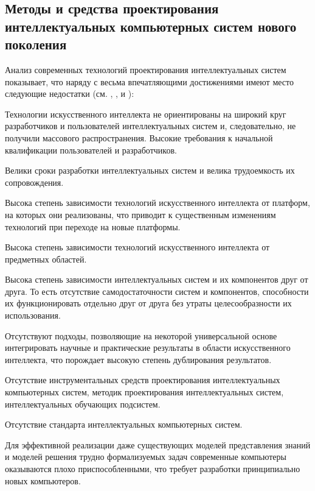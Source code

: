 
\begin{partbacktext}
\part{Методы и средства проектирования интеллектуальных компьютерных систем нового поколения}
\noindent
Анализ современных технологий проектирования интеллектуальных систем показывает, что
наряду с весьма впечатляющими достижениями имеют место следующие недостатки (см. , ,  и ):
\begin{textitemize}
	\item{Технологии искусственного интеллекта не ориентированы на широкий круг разработчиков и пользователей интеллектуальных систем и, следовательно, не получили массового распространения. Высокие требования к начальной квалификации пользователей и разработчиков.}
	\item{Велики сроки разработки интеллектуальных систем и велика трудоемкость их
		сопровождения.}
	\item{Высока степень зависимости технологий искусственного интеллекта от платформ, на которых
		они реализованы, что приводит к существенным изменениям технологий при переходе на
		новые платформы.}
	\item{Высока степень зависимости технологий искусственного интеллекта от предметных областей.}
	\item{Высока степень зависимости интеллектуальных систем и их компонентов друг от друга. То есть отсутствие самодостаточности систем и компонентов, способности их функционировать отдельно друг от друга без утраты целесообразности их использования.}
	\item{Отсутствуют подходы, позволяющие на некоторой универсальной основе интегрировать
		научные и практические результаты в области искусственного интеллекта, что порождает
		высокую степень дублирования результатов.}
	\item{Отсутствие инструментальных средств проектирования интеллектуальных компьютерных систем, методик проектирования интеллектуальных систем, интеллектуальных обучающих подсистем.}
	\item{Отсутствие стандарта интеллектуальных компьютерных систем.}
	\item{Для эффективной реализации даже существующих моделей представления знаний и моделей
		решения трудно формализуемых задач современные компьютеры оказываются плохо
		приспособленными, что требует разработки принципиально новых компьютеров.}
\end{textitemize}


\end{partbacktext}

